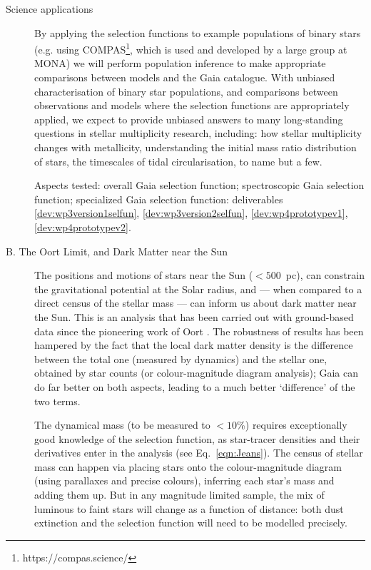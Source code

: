 \begin{workpackage}{Science applications}
\begin{wpobjectives}
\begin{description}
{        By applying the selection functions to example populations of binary stars (e.g. using COMPAS\footnote{https://compas.science/}, which is used and developed by a large group at MONA) we will perform population inference to make appropriate comparisons between models and the Gaia catalogue. With unbiased characterisation of binary star populations, and comparisons between observations and models where the selection functions are appropriately applied, we expect to provide unbiased answers to many long-standing questions in stellar multiplicity research, including: 
        how stellar multiplicity changes with metallicity, understanding the initial mass ratio distribution of stars, the timescales of tidal circularisation, to name but a few.
        
        \textsf{Aspects tested: overall Gaia selection function; spectroscopic Gaia selection function; specialized Gaia selection function: deliverables \ref{dev:wp3version1selfun}, \ref{dev:wp3version2selfun}, \ref{dev:wp4prototypev1}, \ref{dev:wp4prototypev2}.}
        }
      
      \item[B. The Oort Limit, and Dark Matter near the Sun]{
        The positions and motions of stars near the Sun ($<500$~pc), can constrain the gravitational potential at the Solar radius, and --- when compared to a direct census of the stellar mass --- can inform us about dark matter near the Sun. This is an analysis that has been carried out with ground-based data since the pioneering work of Oort \citep[e.g.][]{Read2014}. The robustness of results has been hampered by the fact that the local dark matter density is the difference between the total one (measured by dynamics) and the stellar one, obtained by star counts (or colour-magnitude diagram analysis); Gaia can do far better on both aspects, leading to a much better `difference' of the two terms. 
      
        The dynamical mass (to be measured to $<10$\%) requires exceptionally good knowledge of the selection function, as star-tracer densities and their derivatives enter in the analysis (see Eq.~\ref{eqn:Jeans}). The census of stellar mass can happen via placing stars onto the colour-magnitude diagram (using parallaxes and precise colours), inferring each star's mass and adding them up. But in any magnitude limited sample, the mix of luminous to faint stars will change as a function of distance: both dust extinction and the selection function will need to be modelled precisely. 
      
}
\end{description}
\end{wpobjectives}
\end{workpackage}
